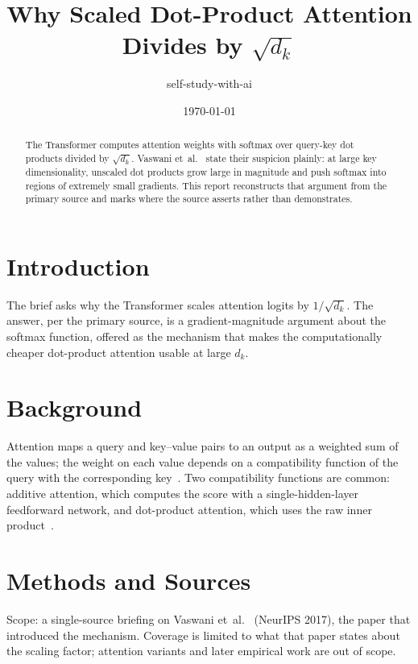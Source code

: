 \documentclass{article}
\title{Why Scaled Dot-Product Attention Divides by $\sqrt{d_k}$}
\author{self-study-with-ai}
\date{\today}
\begin{document}
\maketitle

\begin{abstract}
The Transformer computes attention weights with softmax over query-key dot
products divided by $\sqrt{d_k}$. Vaswani et~al.~\citep{vaswani2017attention}
state their suspicion plainly: at large key dimensionality, unscaled dot
products grow large in magnitude and push softmax into regions of extremely
small gradients. This report reconstructs that argument from the primary
source and marks where the source asserts rather than demonstrates.
\end{abstract}

\section{Introduction}

The brief asks why the Transformer scales attention logits by
$1/\sqrt{d_k}$. The answer, per the primary source, is a gradient-magnitude
argument about the softmax function, offered as the mechanism that makes the
computationally cheaper dot-product attention usable at large $d_k$.

\section{Background}

Attention maps a query and key--value pairs to an output as a weighted sum of
the values; the weight on each value depends on a compatibility function of
the query with the corresponding key~\citep{vaswani2017attention}. Two
compatibility functions are common: additive attention, which computes the
score with a single-hidden-layer feedforward network, and dot-product
attention, which uses the raw inner product~\citep{vaswani2017attention}.

\section{Methods and Sources}

Scope: a single-source briefing on Vaswani et~al.~\citep{vaswani2017attention}
(NeurIPS 2017), the paper that introduced the mechanism. Coverage is limited to what
that paper states about the scaling factor; attention variants and later
empirical work are out of scope.
\end{document}
